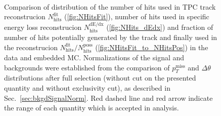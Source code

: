\begin{figure}[hb]
{\begin{subfigure}[b]{\linewidth}
  \end{subfigure}\\
  \begin{minipage}[t][1.042\linewidth][t]{\linewidth}\vspace{10pt}
    \caption[Comparison of distribution of $N_{\textrm{hits}}^{\textrm{fit}}$,~$N_{\textrm{hits}}^{\textrm{dE/dx}}$ and $N_{\textrm{hits}}^{\textrm{fit}}/N_{\textrm{hits}}^{\textrm{poss}}$ in the data and embedded MC]
    {Comparison of distribution of the number of hits used in TPC track reconstrucion $N_{\textrm{hits}}^{\textrm{fit}}$ (\ref{fig:NHitsFit}), number of hits used in specific energy loss reconstrucion $N_{\textrm{hits}}^{\textrm{dE/dx}}$ (\ref{fig:NHits_dEdx}) and fraction of number of hits potentially generated by the track and finally used in the reconstrucion $N_{\textrm{hits}}^{\textrm{fit}}/N_{\textrm{hits}}^{\textrm{poss}}$ (\ref{fig:NHitsFit_to_NHitsPos}) in the data and embedded MC. Normalizations of the signal and backgrounds were established from the comparison of $p_{T}^{\textrm{miss}}$ and $\Delta\theta$ distributions after full selection (without cut on the presented quantity and without exclusivity cut), as described in Sec.~\ref{sec:bkgdSignalNorm}. Red dashed line and red arrow indicate the range of each quantity which is accepted in analysis.}\label{fig:NHits}
  \end{minipage}
}%

\end{figure}







